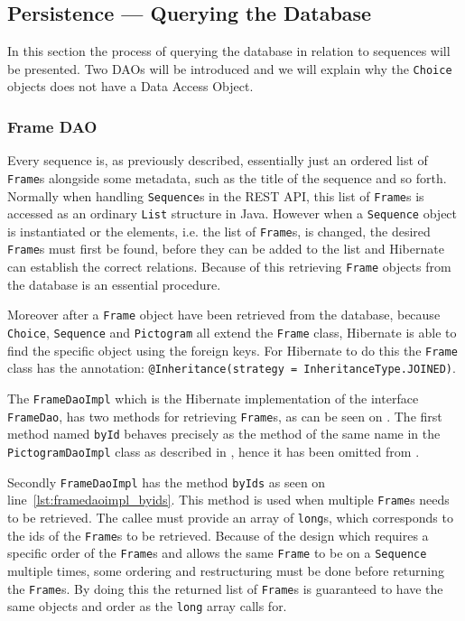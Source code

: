 \subsection{Persistence --- Querying the Database}
In this section the process of querying the database in relation to sequences will be presented.
Two DAOs will be introduced and we will explain why the \texttt{Choice} objects does not have a Data Access Object.

\subsubsection{Frame DAO}
Every sequence is, as previously described, essentially just an ordered list of \texttt{Frame}s alongside some metadata, such as the title of the sequence and so forth.
Normally when handling \texttt{Sequence}s in the REST API, this list of \texttt{Frame}s is accessed as an ordinary \texttt{List} structure in Java.
However when a \texttt{Sequence} object is instantiated or the elements, i.e. the list of \texttt{Frame}s, is changed, the desired \texttt{Frame}s must first be found, before they can be added to the list and Hibernate can establish the correct relations.
Because of this retrieving \texttt{Frame} objects from the database is an essential procedure.

Moreover after a \texttt{Frame} object have been retrieved from the database, because \texttt{Choice}, \texttt{Sequence} and \texttt{Pictogram} all extend the \texttt{Frame} class, Hibernate is able to find the specific object using the foreign keys.
For Hibernate to do this the \texttt{Frame} class has the annotation: \texttt{@Inheritance(strategy = InheritanceType.JOINED)}.

\bigskip
The \texttt{FrameDaoImpl} which is the Hibernate implementation of the interface \texttt{FrameDao}, has two methods for retrieving \texttt{Frame}s, as can be seen on .
The first method named \texttt{byId} behaves precisely as the method of the same name in the \texttt{PictogramDaoImpl} class as described in , hence it has been omitted from .

Secondly \texttt{FrameDaoImpl} has the method \texttt{byIds} as seen on line~\ref{lst:framedaoimpl_byids}.
This method is used when multiple \texttt{Frame}s needs to be retrieved.
The callee must provide an array of \texttt{long}s, which corresponds to the ids of the \texttt{Frame}s to be retrieved.
Because of the design which requires a specific order of the \texttt{Frame}s and allows the same \texttt{Frame} to be on a \texttt{Sequence} multiple times, some ordering and restructuring must be done before returning the \texttt{Frame}s.
By doing this the returned list of \texttt{Frame}s is guaranteed to have the same objects and order as the \texttt{long} array calls for.

